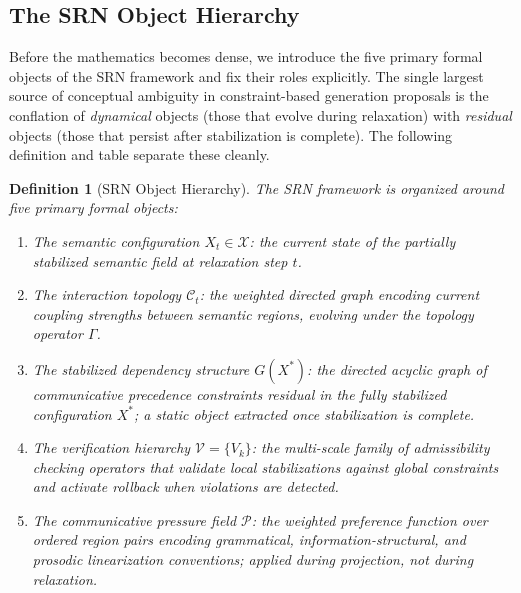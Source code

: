 \documentclass[11pt, a4paper]{article}
\theoremstyle{srn}
\newtheorem{definition}{Definition}[section]
\theoremstyle{srnremark}
\newcommand{\Cstruct}{\mathcal{C}}           %
\newcommand{\Gop}{\Gamma}              %
\begin{document}
\subsection{The SRN Object Hierarchy}
\label{subsec:hierarchy}

Before the mathematics becomes dense, we introduce the five primary
formal objects of the SRN framework and fix their roles explicitly.
The single largest source of conceptual ambiguity in constraint-based
generation proposals is the conflation of \emph{dynamical} objects
(those that evolve during relaxation) with \emph{residual} objects
(those that persist after stabilization is complete).
The following definition and table separate these cleanly.

\begin{definition}[SRN Object Hierarchy]
\label{def:hierarchy}
The SRN framework is organized around five primary formal objects:
\begin{enumerate}
  \item[(O1)] The \emph{semantic configuration} $X_t \in \mathcal{X}$:
    the current state of the partially stabilized semantic field at
    relaxation step $t$.
  \item[(O2)] The \emph{interaction topology} $\Cstruct_t$: the
    weighted directed graph encoding current coupling strengths between
    semantic regions, evolving under the topology operator $\Gop$.
  \item[(O3)] The \emph{stabilized dependency structure} $G(X^*)$: the
    directed acyclic graph of communicative precedence constraints
    residual in the fully stabilized configuration $X^*$; a static
    object extracted once stabilization is complete.
  \item[(O4)] The \emph{verification hierarchy} $\mathcal{V} = \{V_k\}$:
    the multi-scale family of admissibility checking operators that
    validate local stabilizations against global constraints and
    activate rollback when violations are detected.
  \item[(O5)] The \emph{communicative pressure field} $\mathcal{P}$:
    the weighted preference function over ordered region pairs encoding
    grammatical, information-structural, and prosodic linearization
    conventions; applied during projection, not during relaxation.
\end{enumerate}
\end{definition}
\end{document}
